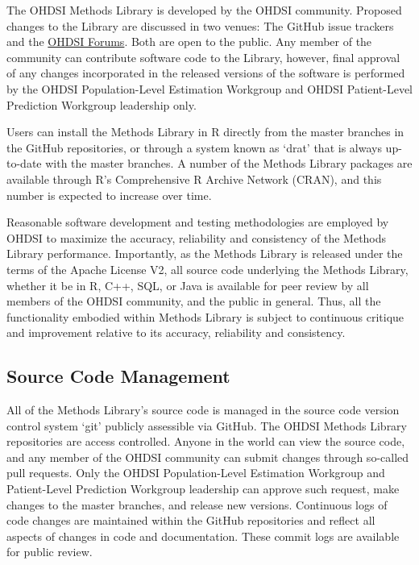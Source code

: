 \documentclass[11pt]{book}
\begin{document}
The OHDSI Methods Library is developed by the OHDSI community. Proposed
changes to the Library are discussed in two venues: The GitHub issue
trackers and the \href{http://forums.ohdsi.org/}{OHDSI Forums}. Both are
open to the public. Any member of the community can contribute software
code to the Library, however, final approval of any changes incorporated
in the released versions of the software is performed by the OHDSI
Population-Level Estimation Workgroup and OHDSI Patient-Level Prediction
Workgroup leadership only.

Users can install the Methods Library in R directly from the master
branches in the GitHub repositories, or through a system known as `drat'
that is always up-to-date with the master branches. A number of the
Methods Library packages are available through R's Comprehensive R
Archive Network (CRAN), and this number is expected to increase over
time.

Reasonable software development and testing methodologies are employed
by OHDSI to maximize the accuracy, reliability and consistency of the
Methods Library performance. Importantly, as the Methods Library is
released under the terms of the Apache License V2, all source code
underlying the Methods Library, whether it be in R, C++, SQL, or Java is
available for peer review by all members of the OHDSI community, and the
public in general. Thus, all the functionality embodied within Methods
Library is subject to continuous critique and improvement relative to
its accuracy, reliability and consistency.

\subsection{Source Code Management}\label{source-code-management}

All of the Methods Library's source code is managed in the source code
version control system `git' publicly assessible via GitHub. The OHDSI
Methods Library repositories are access controlled. Anyone in the world
can view the source code, and any member of the OHDSI community can
submit changes through so-called pull requests. Only the OHDSI
Population-Level Estimation Workgroup and Patient-Level Prediction
Workgroup leadership can approve such request, make changes to the
master branches, and release new versions. Continuous logs of code
changes are maintained within the GitHub repositories and reflect all
aspects of changes in code and documentation. These commit logs are
available for public review.
\end{document}
